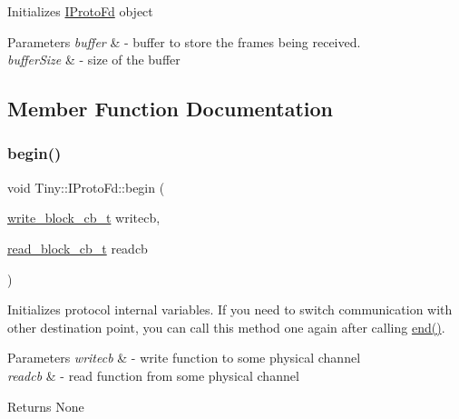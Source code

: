 Initializes \hyperlink{classTiny_1_1IProtoFd}{I\+Proto\+Fd} object 
\begin{DoxyParams}{Parameters}
{\em buffer} & -\/ buffer to store the frames being received. \\
\hline
{\em buffer\+Size} & -\/ size of the buffer \\
\hline
\end{DoxyParams}


\subsection{Member Function Documentation}
\mbox{\label{classTiny_1_1IProtoFd_aae4e613316866105c130d613ecb25dd4}} 
\subsubsection{\texorpdfstring{begin()}{begin()}}
{\footnotesize\ttfamily void Tiny\+::\+I\+Proto\+Fd\+::begin (\begin{DoxyParamCaption}\item[{\hyperlink{tiny__types_8h_aafd634660bba76cace57a8f9b01e044d}{write\+\_\+block\+\_\+cb\+\_\+t}}]{writecb,  }\item[{\hyperlink{tiny__types_8h_a15bec127d9ee63658563d62e92b5261b}{read\+\_\+block\+\_\+cb\+\_\+t}}]{readcb }\end{DoxyParamCaption})}

Initializes protocol internal variables. If you need to switch communication with other destination point, you can call this method one again after calling \hyperlink{classTiny_1_1IProtoFd_ad17e76d0ef7ea40838e51acc2498c482}{end()}. 
\begin{DoxyParams}{Parameters}
{\em writecb} & -\/ write function to some physical channel \\
\hline
{\em readcb} & -\/ read function from some physical channel \\
\hline
\end{DoxyParams}
\begin{DoxyReturn}{Returns}
None 
\end{DoxyReturn}
\mbox{\label{classTiny_1_1IProtoFd_a1cf42b4182e49dcde4862a768d07c811}} 
